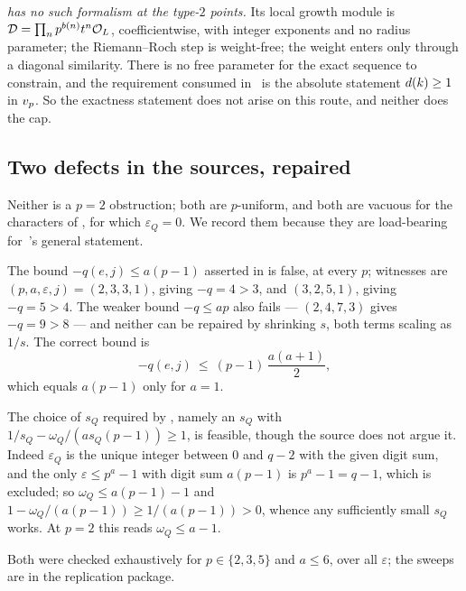 \emph{\cite{kramermiller2020abelian} has no such formalism at the type-$2$
points.} Its local growth module is $\mathcal{D} = \prod_n p^{b(n)}t^n\mathcal{O}_L$,
coefficientwise, with integer exponents and no radius parameter; the
Riemann--Roch step is weight-free; the weight enters only through a diagonal
similarity. There is no free parameter for the exact sequence to constrain,
and the requirement consumed in~\cite[\S7.2, case (II)]{kramermiller2020abelian}
is the absolute statement $d(k)\ge 1$ in $v_p$. So the exactness
statement does not arise on this route, and neither does the cap.

\subsection{Two defects in the sources, repaired}
\label{sec:defects}

Neither is a $p = 2$ obstruction; both are $p$-uniform, and both are vacuous
for the characters of , for which $\varepsilon_Q = 0$. We
record them because they are load-bearing for~\cite{kramermiller2020abelian}'s general statement.

\begin{proposition}
\label{prop:defect-bound}
The bound $-q(e,j) \le a(p-1)$ asserted in
\textup{\cite[\S4.1.1]{kramermiller2020abelian}} is false, at every $p$;
witnesses are $(p,a,\varepsilon,j) = (2,3,3,1)$, giving $-q = 4 > 3$, and
$(3,2,5,1)$, giving $-q = 5 > 4$. The weaker bound $-q \le ap$ also fails
--- $(2,4,7,3)$ gives $-q = 9 > 8$ --- and neither can be repaired by
shrinking $s$, both terms scaling as $1/s$. The correct bound is
\[
  -q(e,j) \ \le \ (p-1)\,\frac{a(a+1)}{2},
\]
which equals $a(p-1)$ only for $a = 1$.
\end{proposition}

\begin{proposition}
\label{prop:defect-feasible}
The choice of $s_Q$ required by
\textup{\cite[eq.\ (18)]{kramermiller2020abelian}}, namely an $s_Q$ with
$1/s_Q - \omega_Q/(as_Q(p-1)) \ge 1$, is feasible, though the source does
not argue it. Indeed $\varepsilon_Q$ is the unique integer between $0$ and
$q-2$ with the given digit sum, and the only $\varepsilon \le p^a-1$ with
digit sum $a(p-1)$ is $p^a-1 = q-1$, which is excluded; so $\omega_Q \le
a(p-1)-1$ and $1 - \omega_Q/(a(p-1)) \ge 1/(a(p-1)) > 0$, whence any
sufficiently small $s_Q$ works. At $p = 2$ this reads $\omega_Q \le a-1$.
\end{proposition}

Both were checked exhaustively for $p \in \{2,3,5\}$ and $a \le 6$, over all
$\varepsilon$; the sweeps are in the replication package.

